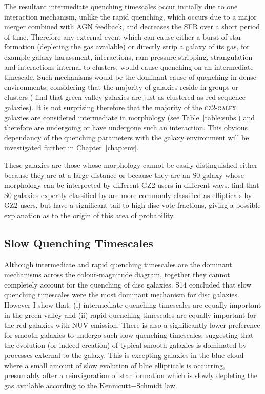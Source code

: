 The resultant intermediate quenching timescales occur initially due to one interaction mechanism, unlike the rapid quenching, which occurs due to a major merger combined with AGN feedback, and decreases the SFR over a short period of time. Therefore any external event which can cause either a burst of star formation (depleting the gas available) or directly strip a galaxy of its gas, for example galaxy harassment, interactions, ram pressure stripping, strangulation and interactions internal to clusters, would cause quenching on an intermediate timescale. Such mechanisms would be the dominant cause of quenching in dense environments; considering that the majority of galaxies reside in groups or clusters (\citealt{Coil08} find that green valley galaxies are just as clustered as red sequence galaxies). It is not surprising therefore that the majority of the \textsc{gz2-galex} galaxies are considered intermediate in morphology (see Table~\ref{table:subs}) and therefore are undergoing or have undergone such an interaction. This obvious dependancy of the quenching parameters with the galaxy environment will be investigated further in Chapter~\ref{chap:env}.

These galaxies are those whose morphology cannot be easily distinguished either because they are at a large distance or because they are an S0 galaxy whose morphology can be interpreted by different GZ2 users in different ways. \citet{GZ2} find that S0 galaxies expertly classified by \citet{nair10} are more commonly classified as ellipticals by GZ2 users, but have a significant tail to high disc vote fractions, giving a possible explanation as to the origin of this area of probability.


\subsection{Slow Quenching Timescales}\label{slow}
Although intermediate and rapid quenching timescales are the dominant mechanisms across the colour-magnitude diagram, together they cannot completely account for the quenching of disc galaxies. S14 concluded that slow quenching timescales were the most dominant mechanism for disc galaxies. However I show that: (i) intermediate quenching timescales are equally important in the green valley and (ii) rapid quenching timescales are equally important for the red galaxies with NUV emission. There is also a significantly lower preference for smooth galaxies to undergo such slow quenching timescales; suggesting that the evolution (or indeed creation) of typical smooth galaxies is dominated by processes external to the galaxy. This is excepting galaxies in the blue cloud where a small amount of slow evolution of blue ellipticals is occurring, presumably after a reinvigoration of star formation which is slowly depleting the gas available according to the Kennicutt$-$Schmidt law.

